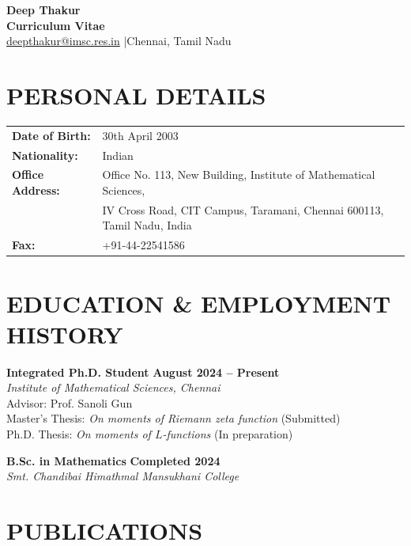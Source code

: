 \documentclass[a4paper,9pt]{extarticle}
\begin{document}
	
	\pagestyle{empty}
	
	\begin{center}
		{\huge \textbf{Deep Thakur}}\\[5pt]
		\textbf{Curriculum Vitae}\\[3pt]
		\href{mailto:deepthakur@imsc.res.in}{deepthakur@imsc.res.in} \quad|\quad Chennai, Tamil Nadu
	\end{center}
	
	\section*{PERSONAL DETAILS}
	\begin{tabular}{@{}ll}
		\textbf{Date of Birth:} & 30th April 2003 \\
		\textbf{Nationality:} & Indian \\
		\textbf{Office Address:} & Office No. 113, New Building, Institute of Mathematical Sciences,\\
		& IV Cross Road, CIT Campus, Taramani, Chennai 600113, Tamil Nadu, India \\
		\textbf{Fax:} & +91-44-22541586
	\end{tabular}
	
	\section*{EDUCATION \& EMPLOYMENT HISTORY}
	
	\noindent\textbf{Integrated Ph.D. Student} \hfill \textbf{August 2024 -- Present} \\
	\textit{Institute of Mathematical Sciences, Chennai} \\
	Advisor: Prof. Sanoli Gun \\
	Master's Thesis: \textit{On moments of Riemann zeta function} (Submitted) \\
	Ph.D. Thesis: \textit{On moments of $L$-functions} (In preparation)
	
	\vspace{1em}
	
	\noindent\textbf{B.Sc. in Mathematics} \hfill \textbf{Completed 2024} \\
	\textit{Smt. Chandibai Himathmal Mansukhani College} 
	
	\section*{PUBLICATIONS}
\end{document}
